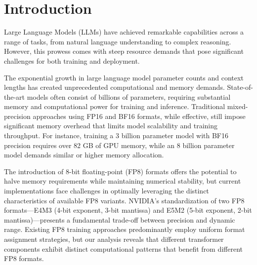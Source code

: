 \chapter{Introduction}
Large Language Models (LLMs) have achieved remarkable capabilities across a range of tasks, from natural language understanding to complex reasoning. However, this prowess comes with steep resource demands that pose significant challenges for both training and deployment.

The exponential growth in large language model parameter counts and context lengths has created unprecedented computational and memory demands. State-of-the-art models often consist of billions of parameters, requiring substantial memory and computational power for training and inference. Traditional mixed-precision approaches using FP16 and BF16 formats, while effective, still impose significant memory overhead that limits model scalability and training throughput. For instance, training a 3 billion parameter model with BF16 precision requires over 82 GB of GPU memory, while an 8 billion parameter model demands similar or higher memory allocation.

The introduction of 8-bit floating-point (FP8) formats offers the potential to halve memory requirements while maintaining numerical stability, but current implementations face challenges in optimally leveraging the distinct characteristics of available FP8 variants. NVIDIA's standardization of two FP8 formats—E4M3 (4-bit exponent, 3-bit mantissa) and E5M2 (5-bit exponent, 2-bit mantissa)—presents a fundamental trade-off between precision and dynamic range. Existing FP8 training approaches predominantly employ uniform format assignment strategies, but our analysis reveals that different transformer components exhibit distinct computational patterns that benefit from different FP8 formats.






% 
